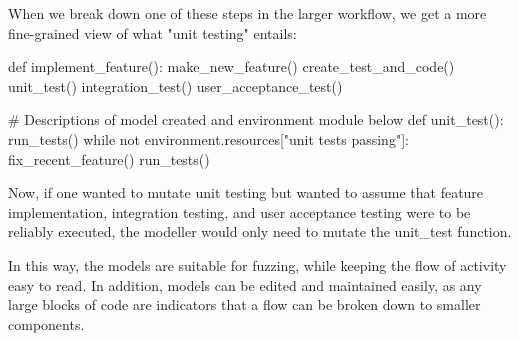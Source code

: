 When we break down one of these steps in the larger workflow, we get a more fine-grained view of what "unit testing" entails:\label{small_code_sample}
\begin{pyglist}[language = python, encoding = utf8]
def implement_feature():
    make_new_feature()
    create_test_and_code()
    unit_test()
    integration_test()
    user_acceptance_test()

# Descriptions of model created and environment module below
def unit_test():
    run_tests()
    while not environment.resources["unit tests passing"]:
        fix_recent_feature()
        run_tests()
\end{pyglist}\par
Now, if one wanted to mutate unit testing but wanted to assume that feature implementation, integration testing, and user acceptance testing were to be reliably executed, the modeller would only need to mutate the unit\_test\(\) function. \par
In this way, the models are suitable for fuzzing, while keeping the flow of activity easy to read. In addition, models can be edited and maintained easily, as any large blocks of code are indicators that a flow can be broken down to smaller components. \par
{}

